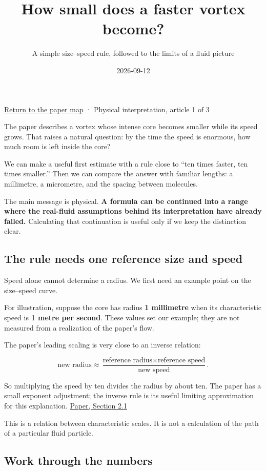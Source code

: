 \documentclass[
  english,
  11pt,
]{article}
\title{How small does a faster vortex become?}
\subtitle{A simple size--speed rule, followed to the limits of a fluid
picture}
\author{}
\date{2026-09-12}
\begin{document}
\maketitle


\href{../paper-map/article.html}{Return to the paper map} · Physical
interpretation, article 1 of 3

The paper describes a vortex whose intense core becomes smaller while
its speed grows. That raises a natural question: by the time the speed
is enormous, how much room is left inside the core?

We can make a useful first estimate with a rule close to ``ten times
faster, ten times smaller.'' Then we can compare the answer with
familiar lengths: a millimetre, a micrometre, and the spacing between
molecules.

The main message is physical. \textbf{A formula can be continued into a
range where the real-fluid assumptions behind its interpretation have
already failed.} Calculating that continuation is useful only if we keep
the distinction clear.

\subsection{The rule needs one reference size and
speed}\label{the-rule-needs-one-reference-size-and-speed}

Speed alone cannot determine a radius. We first need an example point on
the size--speed curve.

For illustration, suppose the core has radius \textbf{1 millimetre} when
its characteristic speed is \textbf{1 metre per second}. These values
set our example; they are not measured from a realization of the paper's
flow.

The paper's leading scaling is very close to an inverse relation:

\[
\text{new radius}\approx
\frac{\text{reference radius}\times\text{reference speed}}
{\text{new speed}}.
\]

So multiplying the speed by ten divides the radius by about ten. The
paper has a small exponent adjustment; the inverse rule is its useful
limiting approximation for this explanation.
\href{https://cdn.openai.com/pdf/32d9f210-8b73-45e0-91bc-82a30aef8a9a/navier-stokes.pdf}{Paper,
Section 2.1}

This is a relation between characteristic scales. It is not a
calculation of the path of a particular fluid particle.

\subsection{Work through the numbers}\label{work-through-the-numbers}
\end{document}
